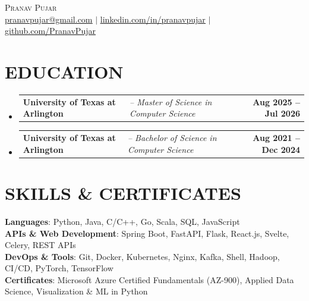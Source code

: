 \documentclass[letterpaper,11pt]{article}
\makeatletter
\newcommand{\resumeItem}[1]{
  \item\small{
    {#1 \vspace{-2pt}}
  }
}
\newcommand{\educationSubheading}[3]{%
  \vspace{-2pt}\item
    \begin{tabular*}{1\textwidth}[t]{ll@{\extracolsep{\fill}}r}
      \textbf{#1} & \textit{\small #2} & \textbf{\small #3} \\ 
    \end{tabular*}\vspace{-2pt}
}
\newcommand{\resumeSubHeadingListStart}{\begin{itemize}[leftmargin=0.0in, label={}]}
\newcommand{\resumeSubHeadingListEnd}{\end{itemize}}
\newcommand{\resumeItemListStart}{\begin{itemize}}
\newcommand{\resumeItemListEnd}{\end{itemize}\vspace{-5pt}}
\makeatother
\begin{document}
\begin{center}
    \textsc{\Huge \scshape Pranav Pujar} \\ \vspace{1pt}
    \href{mailto:pranavpujar@gmail.com} {\underline{pranavpujar@gmail.com}} $|$ 
    \href{https://linkedin.com/in/pranavpujar}{\underline{linkedin.com/in/pranavpujar}} $|$
    \href{https://github.com/PranavPujar}{\underline{github.com/PranavPujar}}
\end{center}


\section{EDUCATION}
  \resumeSubHeadingListStart
    \educationSubheading
      {University of Texas at Arlington}{ -- Master of Science in Computer Science}{Aug 2025 -- Jul 2026}
      \resumeItemListStart
      \resumeItemListEnd
    \educationSubheading
      {University of Texas at Arlington}{ -- Bachelor of Science in Computer Science}{Aug 2021 -- Dec 2024}
        \resumeItemListStart 
            
        \resumeItemListEnd
  \resumeSubHeadingListEnd


\section{SKILLS \& CERTIFICATES}
 \begin{itemize}[leftmargin=0.15in, label={}]
    \small{\item{
     \textbf{Languages}{: Python, Java, C/C++, Go, Scala, SQL, JavaScript} \\
     \textbf{APIs \& Web Development}{: Spring Boot, FastAPI, Flask, React.js, Svelte, Celery, REST APIs} \\ %
     \textbf{DevOps \& Tools}{: Git, Docker, Kubernetes, Nginx, Kafka, Shell, Hadoop, CI/CD, PyTorch, TensorFlow} \\ 
     \textbf{Certificates}{: Microsoft Azure Certified Fundamentals (AZ-900), Applied Data Science, Visualization \& ML in Python} \\
    }}
 \end{itemize}
\end{document}
